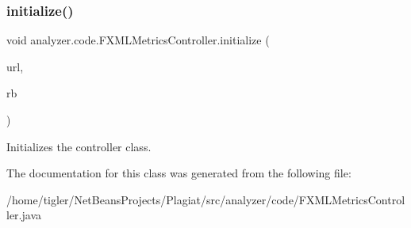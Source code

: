 \subsubsection{\texorpdfstring{initialize()}{initialize()}}
{\footnotesize\ttfamily void analyzer.\+code.\+F\+X\+M\+L\+Metrics\+Controller.\+initialize (\begin{DoxyParamCaption}\item[{U\+RL}]{url,  }\item[{Resource\+Bundle}]{rb }\end{DoxyParamCaption})\hspace{0.3cm}{\ttfamily [inline]}}

Initializes the controller class. 

The documentation for this class was generated from the following file\+:\begin{DoxyCompactItemize}
\item 
/home/tigler/\+Net\+Beans\+Projects/\+Plagiat/src/analyzer/code/F\+X\+M\+L\+Metrics\+Controller.\+java\end{DoxyCompactItemize}
